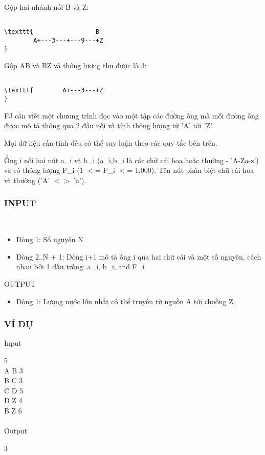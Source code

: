 Gộp hai nhánh nối B và Z:
\begin{verbatim}

\texttt{                 B
        A+---3---+---9---+Z
}\end{verbatim}

Gộp AB và BZ và thông lượng thu được là 3:
\begin{verbatim}

\texttt{        A+---3---+Z
}\end{verbatim}

FJ cần viết một chương trình đọc vào một tập các đường ống mà mỗi đường ống được mô tả thông qua 2 đầu nối và tính thông lượng từ 'A' tới 'Z'.

Mọi dữ liệu cần tính đều có thể suy luận theo các quy tắc bên trên.

Ống i nối hai nút a\_i và b\_i (a\_i,b\_i là các chữ cái hoa hoặc thường - 'A-Za-z') và có thông lượng F\_i (1 $<$= F\_i $<$= 1,000). Tên nút phân biệt chữ cái hoa và thường ('A' $<$$>$ 'a').

\subsubsection{INPUT}

 
\begin{itemize}
	\item Dòng 1: Số nguyên N
	\item Dòng 2..N + 1: Dòng i+1 mô tả ống i qua hai chữ cái và một số nguyên, cách nhau bởi 1 dấu trống: a\_i, b\_i, and F\_i
\end{itemize}

OUTPUT
\begin{itemize}
	\item Dòng 1: Lượng nước lớn nhất có thể truyền từ nguồn A tới chuồng Z.
\end{itemize}

\subsubsection{VÍ DỤ}

Input

5
\\A B 3
\\B C 3
\\C D 5
\\D Z 4
\\B Z 6
\\
\\Output

3